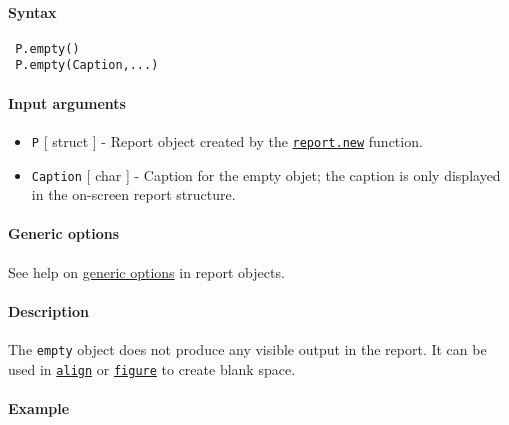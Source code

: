 


	\paragraph{Syntax}
 
 \begin{verbatim}
 P.empty()
 P.empty(Caption,...)
 \end{verbatim}
 
 \paragraph{Input arguments}
 
 \begin{itemize}
 \item
   \texttt{P} {[} struct {]} - Report object created by the
   \href{report/new}{\texttt{report.new}} function.
 \item
   \texttt{Caption} {[} char {]} - Caption for the empty objet; the
   caption is only displayed in the on-screen report structure.
 \end{itemize}
 
 \paragraph{Generic options}
 
 See help on \href{report/Contents}{generic options} in report objects.
 
 \paragraph{Description}
 
 The \texttt{empty} object does not produce any visible output in the
 report. It can be used in \href{report/align}{\texttt{align}} or
 \href{report/figure}{\texttt{figure}} to create blank space.
 
 \paragraph{Example}


